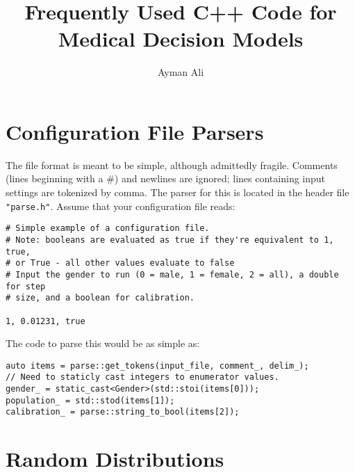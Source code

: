 \documentclass{article}
\begin{document}
\title{%
    Frequently Used C++ Code for Medical Decision Models \\
}
\author{Ayman Ali}
\date{}
\maketitle

\clearpage

\tableofcontents
\listoffigures
\listoftables

\clearpage

\section{Configuration File Parsers}
The file format is meant to be simple, although admittedly fragile. Comments (lines beginning with a \#) and newlines are ignored; lines containing input settings are tokenized by comma. The parser for this is located in the header file \verb|"parse.h"|. Assume that your configuration file reads:
\begin{verbatim}
# Simple example of a configuration file.
# Note: booleans are evaluated as true if they're equivalent to 1, true,
# or True - all other values evaluate to false 
# Input the gender to run (0 = male, 1 = female, 2 = all), a double for step
# size, and a boolean for calibration.

1, 0.01231, true

\end{verbatim}
The code to parse this would be as simple as:
\begin{verbatim}
auto items = parse::get_tokens(input_file, comment_, delim_);
// Need to staticly cast integers to enumerator values.
gender_ = static_cast<Gender>(std::stoi(items[0]));
population_ = std::stod(items[1]);
calibration_ = parse::string_to_bool(items[2]);
\end{verbatim}

\section{Random Distributions}
\end{document}
